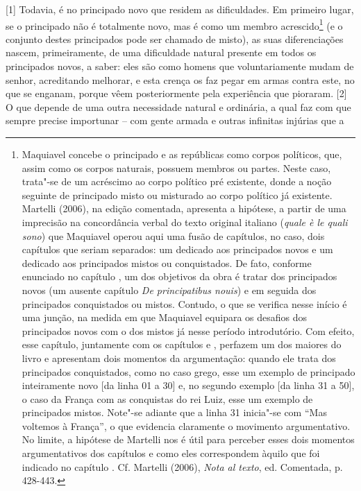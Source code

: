 {[}1{]} Todavia, é no principado novo que residem as dificuldades. Em
primeiro lugar, se o principado não é totalmente novo, mas é como um
membro acrescido\footnote{Maquiavel concebe o principado e as repúblicas
  como corpos políticos, que, assim como os corpos naturais, possuem
  membros ou partes. Neste caso, trata"-se de um acréscimo ao corpo
  político pré existente, donde a noção seguinte de principado misto ou
  misturado ao corpo político já existente. Martelli (2006), na edição
  comentada, apresenta a hipótese, a partir de uma imprecisão na
  concordância verbal do texto original italiano (\emph{quale è le quali
  sono}) que Maquiavel operou aqui uma fusão de capítulos, no caso, dois
  capítulos que seriam separados: um dedicado aos principados novos e um
  dedicado aos principados mistos ou conquistados. De fato, conforme
  enunciado no capítulo , um dos objetivos da obra é tratar dos
  principados novos (um ausente capítulo \emph{De principatibus nouis})
  e em seguida dos principados conquistados ou mistos. Contudo, o que se
  verifica nesse início é uma junção, na medida em que Maquiavel
  equipara os desafios dos principados novos com o dos mistos já nesse
  período introdutório. Com efeito, esse capítulo, juntamente com os
  capítulos  e , perfazem um dos maiores do livro e apresentam
  dois momentos da argumentação: quando ele trata dos principados
  conquistados, como no caso grego, esse um exemplo de principado
  inteiramente novo {[}da linha 01 a 30{]} e, no segundo exemplo {[}da
  linha 31 a 50{]}, o caso da França com as conquistas do rei Luiz, esse
  um exemplo de principados mistos. Note"-se adiante que a linha 31
  inicia"-se com ``Mas voltemos à França'', o que evidencia claramente o
  movimento argumentativo. No limite, a hipótese de Martelli nos é útil
  para perceber esses dois momentos argumentativos dos capítulos e como
  eles correspondem àquilo que foi indicado no capítulo . Cf. Martelli
  (2006), \emph{Nota al texto}, ed. Comentada, p. 428-443.} (e o
conjunto destes principados pode ser chamado de misto), as suas
diferenciações nascem, primeiramente, de uma dificuldade natural
presente em todos os principados novos, a saber: eles são como homens
que voluntariamente mudam de senhor, acreditando melhorar, e esta crença
os faz pegar em armas contra este, no que se enganam, porque vêem
posteriormente pela experiência que pioraram. {[}2{]} O que depende de
uma outra necessidade natural e ordinária, a qual faz com que sempre
precise importunar -- com gente armada e outras infinitas injúrias que a

